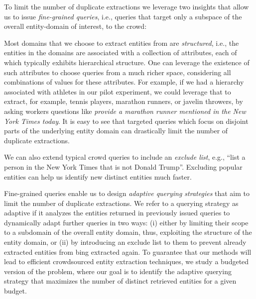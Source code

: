  To limit the number of duplicate extractions we leverage two insights that allow us to issue {\em fine-grained queries}, i.e., queries that target only a subspace of the overall entity-domain of interest, to the crowd:

Most domains that we choose to extract entities from are {\em structured}, i.e., the entities in the domains are associated with a collection of attributes, each of which typically exhibits hierarchical structure. One can leverage the existence of such attributes to choose queries from a much richer space, considering all combinations of values for these attributes. For example, if we had a hierarchy associated with athletes in our pilot experiment, we could leverage that to extract, for example, tennis players, marathon runners, or javelin throwers, by asking workers questions like {\em provide a marathon runner mentioned in the New York Times today}. It is easy to see that targeted queries which focus on disjoint parts of the underlying entity domain can drastically limit the number of duplicate extractions.

We can also extend typical crowd queries to include an {\em exclude list}, e.g., ``list a person in the New York Times that is not Donald Trump''.  Excluding popular entities can help us identify new distinct entities much faster.

Fine-grained queries enable us to design {\em adaptive querying strategies} that aim to limit the number of duplicate extractions. We refer to a querying strategy as adaptive if it analyzes the entities returned in previously issued queries to dynamically adapt further queries in two ways: (i) either by limiting their scope to a subdomain of the overall entity domain, thus, exploiting the structure of the entity domain, or (ii) by introducing an exclude list to them to prevent already extracted entities from bing extracted again. To guarantee that our methods will lead to efficient crowdsourced entity extraction techniques, we study a budgeted version of the problem, where our goal is to identify the adaptive querying strategy that maximizes the number of distinct retrieved entities for a given budget.

